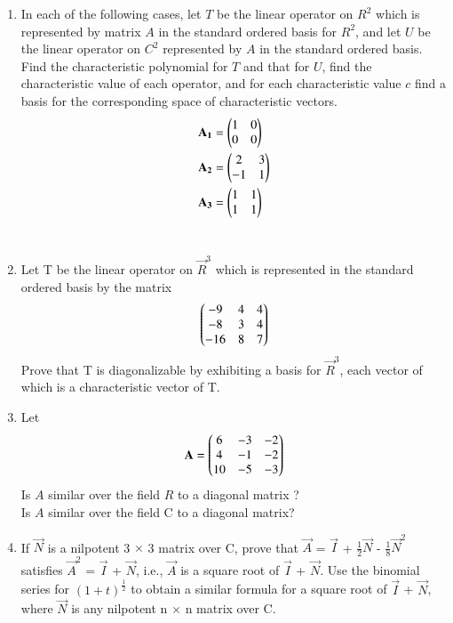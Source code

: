 \renewcommand{\theequation}{\theenumi}
\renewcommand{\thefigure}{\theenumi}
\begin{enumerate}[label=\thesubsection.\arabic*.,ref=\thesubsection.\theenumi]


\item In each of the following cases, let $T$ be the linear operator on $R^2$ which is represented by matrix $A$ in the standard ordered basis for $R^2$, and let $U$ be the linear operator on $C^2$ represented by $A$ in the standard ordered basis. Find the characteristic polynomial for $T$ and that for $U$, find the characteristic value of each operator, and for each characteristic value $c$ find a basis for the corresponding space of characteristic vectors.
\begin{align}
    \mathbf{A_1} &= \begin{pmatrix}1&0\\
                     0&0\end{pmatrix}\\
    \mathbf{A_2} &= \begin{pmatrix}2&3\\
                     -1&1\end{pmatrix}\\
    \mathbf{A_3} &= \begin{pmatrix}1&1\\
                     1&1\end{pmatrix}
\end{align}     
%
%
\\
\solution

\item Let T be the linear operator on $\vec{R}^3$ which is represented in the standard ordered basis by the matrix
\begin{align}
\begin{pmatrix}-9&4&4\\-8&3&4\\-16&8&7\end{pmatrix}
\label{eq:solutions/6/2/4/Q}
\end{align}
Prove that T is diagonalizable by exhibiting a basis for $\vec{R}^3$, each vector of which is a characteristic vector of T. 
%
%
\\
\solution

\item Let
\begin{align}
\mathbf{A}=\begin{pmatrix}6&-3&-2\\4&-1&-2\\10&-5&-3\end{pmatrix}
\end{align}
Is $A$ similar over the field $R$ to a diagonal matrix ? \\Is $A$ similar over the field C to a diagonal matrix?
%
%
\\
\solution

\twocolumn
\item If $\vec{N}$ is a nilpotent 3 $\times$ 3 matrix over C, prove that $\vec{A}$ = $\vec{I}$ + $\frac{1}{2}\vec{N}$ - $\frac{1}{8}\vec{N}^{2}$ satisfies $\vec{A}^2$ = $\vec{I}$ + $\vec{N}$, i.e., $\vec{A}$ is a square root of $\vec{I}$ + $\vec{N}$. Use the binomial series for $(1 + t)^\frac{1}{2}$ to obtain a similar formula for a square root of $\vec{I}$ + $\vec{N}$, where $\vec{N}$ is any nilpotent n $\times$ n matrix over C.
%
\\
\solution

\end{enumerate}
